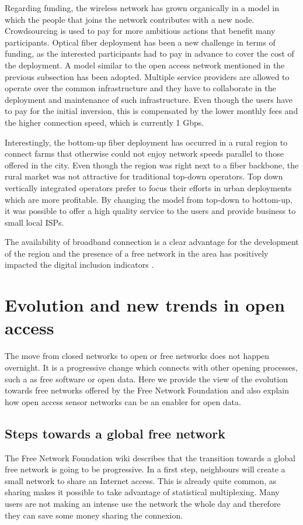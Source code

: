 \documentclass[journal]{IEEEtran}
\begin{document}
Regarding funding, the wireless network has grown organically in a model in which the people that joins the network contributes with a new node.
Crowdsourcing is used to pay for more ambitious actions that benefit many participants.
Optical fiber deployment has been a new challenge in terms of funding, as the interested participants had to pay in advance to cover the cost of the deployment.
A model similar to the open access network mentioned in the previous subsection has been adopted.
Multiple service providers are allowed to operate over the common infrastructure and they have to collaborate in the deployment and maintenance of such infrastructure.
Even though the users have to pay for the initial inversion, this is compensated by the lower monthly fees and the higher connection speed, which is currently 1 Gbps.

Interestingly,  the bottom-up fiber deployment has occurred in a rural region to connect farms that otherwise could not enjoy network speeds parallel to those offered in the city.
Even though the region was right next to a fiber backbone, the rural market was not attractive for traditional top-down operators.
Top down vertically integrated operators prefer to focus their efforts in urban deployments which are more profitable.
By changing the model from top-down to bottom-up, it was possible to offer a high quality service to the users and provide business to small local ISPs.

The availability of broadband connection is a clear advantage for the development of the region and the presence of a free network in the area has positively impacted the digital inclusion indicators \cite{oliver2010wca}.

\section{Evolution and new trends in open access}

The move from closed networks to open or free networks does not happen overnight.
It is a progressive change which connects with other opening processes, such a as free software or open data.
Here we provide the view of the evolution towards free networks offered by the Free Network Foundation and also explain how open access sensor networks can be an enabler for open data.


\subsection{Steps towards a global free network}
The Free Network Foundation wiki describes that the transition towards a global free network is going to be progressive.
In a first step, neighbours will create a small network to share an Internet access.
This is already quite common, as sharing makes it possible to take advantage of statistical multiplexing.
Many users are not making an intense use the network the whole day and therefore they can save some money sharing the connexion.
\end{document}
